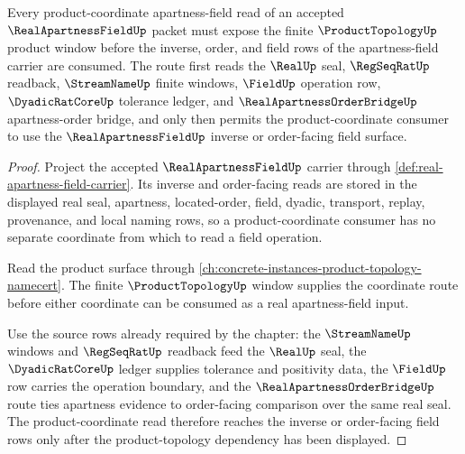\begin{theorem}
\label{thm:real-apartness-field-product-topology-dependency}
Every product-coordinate apartness-field read of an accepted $\RealApartnessFieldUp$ packet must expose the finite $\ProductTopologyUp$ product window before the inverse, order, and field rows of the apartness-field carrier are consumed. The route first reads the $\RealUp$ seal, $\RegSeqRatUp$ readback, $\StreamNameUp$ finite windows, $\FieldUp$ operation row, $\DyadicRatCoreUp$ tolerance ledger, and $\RealApartnessOrderBridgeUp$ apartness-order bridge, and only then permits the product-coordinate consumer to use the $\RealApartnessFieldUp$ inverse or order-facing field surface.
\end{theorem}
\begin{proof}
Project the accepted $\RealApartnessFieldUp$ carrier through \autoref{def:real-apartness-field-carrier}. Its inverse and order-facing reads are stored in the displayed real seal, apartness, located-order, field, dyadic, transport, replay, provenance, and local naming rows, so a product-coordinate consumer has no separate coordinate from which to read a field operation.

Read the product surface through \autoref{ch:concrete-instances-product-topology-namecert}. The finite $\ProductTopologyUp$ window supplies the coordinate route before either coordinate can be consumed as a real apartness-field input.

Use the source rows already required by the chapter: the $\StreamNameUp$ windows and $\RegSeqRatUp$ readback feed the $\RealUp$ seal, the $\DyadicRatCoreUp$ ledger supplies tolerance and positivity data, the $\FieldUp$ row carries the operation boundary, and the $\RealApartnessOrderBridgeUp$ route ties apartness evidence to order-facing comparison over the same real seal. The product-coordinate read therefore reaches the inverse or order-facing field rows only after the product-topology dependency has been displayed.
\end{proof}

